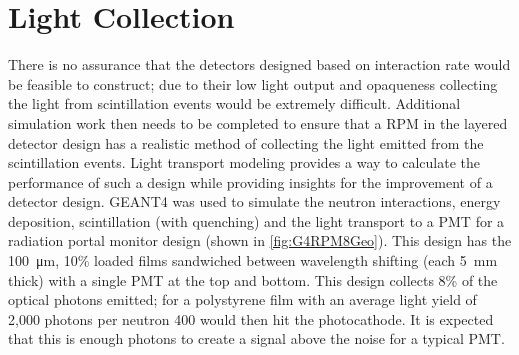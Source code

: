 \section{Light Collection}
There is no assurance that the detectors designed based on interaction rate would be feasible to construct; due to their low light output and opaqueness collecting the light from scintillation events would be extremely difficult.  
Additional simulation work then needs to be completed to ensure that a RPM in the layered detector design has a realistic method of collecting the light emitted from the scintillation events.
Light transport modeling provides a way to calculate the performance of such a design while providing insights for the improvement of a detector design.
GEANT4 was used to simulate the neutron interactions, energy deposition, scintillation (with quenching) and the light transport to a PMT for a radiation portal monitor design (shown in \autoref{fig:G4RPM8Geo}).
This design has the \SI{100}{\um}, 10\% loaded  films sandwiched between wavelength shifting (each \SI{5}{\mm} thick) with a single PMT at the top and bottom.
This design collects 8\% of the optical photons emitted; for a polystyrene film with an average light yield of 2,000 photons per neutron 400 would then hit the photocathode.
It is expected that this is enough photons to create a signal above the noise for a typical PMT.
